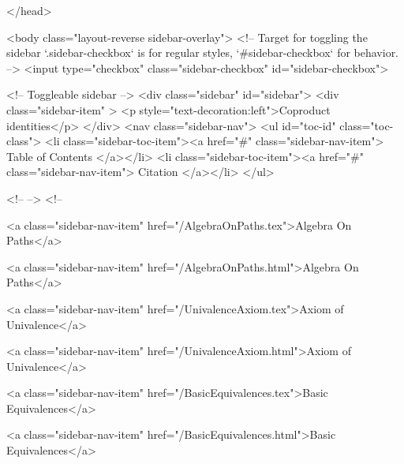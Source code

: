   
</head>




  <body class="layout-reverse sidebar-overlay">
    <!-- Target for toggling the sidebar `.sidebar-checkbox` is for regular
     styles, `#sidebar-checkbox` for behavior. -->
<input type="checkbox" class="sidebar-checkbox" id="sidebar-checkbox">

<!-- Toggleable sidebar -->
<div class="sidebar" id="sidebar">
  <div class="sidebar-item" >
    <p style="text-decoration:left">Coproduct identities</p>
  </div>
  <nav class="sidebar-nav">
    <ul id="toc-id" class="toc-class">
  <li class="sidebar-toc-item"><a href="#" class="sidebar-nav-item"> Table of Contents </a></li>
  <li class="sidebar-toc-item"><a href="#" class="sidebar-nav-item"> Citation </a></li>
</ul>


    <!--  -->
    <!-- 
      
    
      
    
      
    
      
    
      
        
      
    
      
        
          <a class="sidebar-nav-item" href="/AlgebraOnPaths.tex">Algebra On Paths</a>
        
      
    
      
        
          <a class="sidebar-nav-item" href="/AlgebraOnPaths.html">Algebra On Paths</a>
        
      
    
      
        
          <a class="sidebar-nav-item" href="/UnivalenceAxiom.tex">Axiom of Univalence</a>
        
      
    
      
        
          <a class="sidebar-nav-item" href="/UnivalenceAxiom.html">Axiom of Univalence</a>
        
      
    
      
        
          <a class="sidebar-nav-item" href="/BasicEquivalences.tex">Basic Equivalences</a>
        
      
    
      
        
          <a class="sidebar-nav-item" href="/BasicEquivalences.html">Basic Equivalences</a>
        

